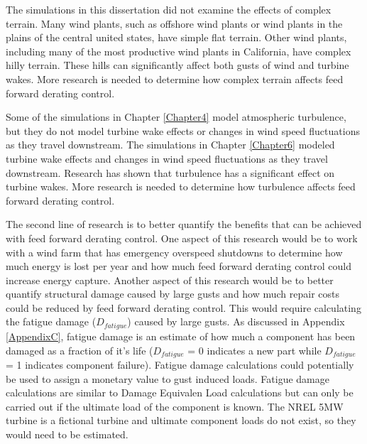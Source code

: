 The simulations in this dissertation did not examine the effects of complex terrain. Many wind plants, such as offshore wind plants or wind plants in the plains of the central united states, have simple flat terrain. Other wind plants, including many of the most productive wind plants in California, have complex hilly terrain. These hills can significantly affect both gusts of wind and turbine wakes. More research is needed to determine how complex terrain affects feed forward derating control. 

Some of the simulations in Chapter \ref{Chapter4} model atmospheric turbulence, but they do not model turbine wake effects or changes in wind speed fluctuations as they travel downstream. The simulations in Chapter \ref{Chapter6} modeled  turbine wake effects and changes in wind speed fluctuations as they travel downstream. Research has shown that turbulence has a significant effect on turbine wakes.\cite{troldborg2015, troldborg2010,madsen2010} More research is needed to determine how turbulence affects feed forward derating control.

The second line of research is to better quantify the benefits that can be achieved with feed forward derating control. One aspect of this research would be to work with a wind farm that has emergency overspeed shutdowns to determine how much energy is lost per year and how much feed forward derating control could increase energy capture. Another aspect of this research would be to better quantify structural damage caused by large gusts and how much repair costs could be reduced by feed forward derating control. This would require calculating the fatigue damage ($D_{fatigue}$) caused by large gusts. As discussed in Appendix \ref{AppendixC}, fatigue damage is an estimate of how much a component has been damaged as a fraction of it's life ($D_{fatigue}$ = 0 indicates a new part while $D_{fatigue}$ = 1 indicates component failure). Fatigue damage calculations could potentially be used to assign a monetary value to gust induced loads. Fatigue damage calculations are similar to Damage Equivalen Load calculations but can only be carried out if the ultimate load of the component is known. The NREL 5MW turbine is a fictional turbine and ultimate component loads do not exist, so they would need to be estimated. 